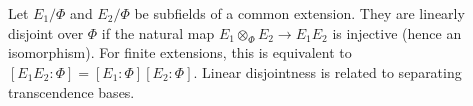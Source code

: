 Let $E_1/\Phi$ and $E_2/\Phi$ be subfields of a common extension. They are linearly disjoint over $\Phi$ if the natural map $E_1 \otimes_\Phi E_2 \to E_1 E_2$ is injective (hence an isomorphism). For finite extensions, this is equivalent to $[E_1 E_2 : \Phi] = [E_1 : \Phi][E_2 : \Phi]$. Linear disjointness is related to separating transcendence bases.
